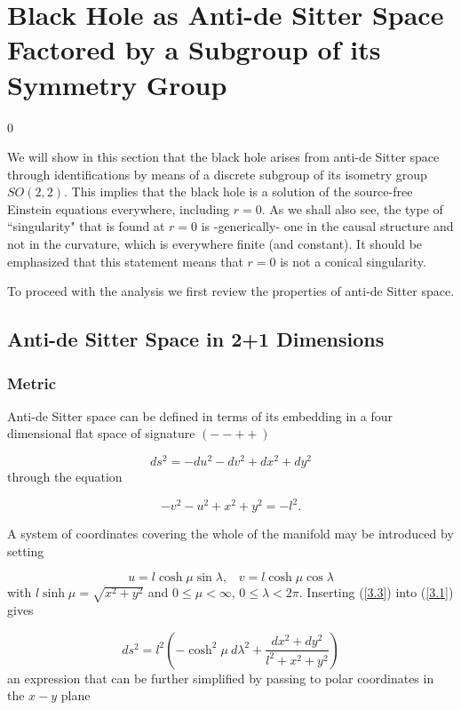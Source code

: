 \documentclass[12pt]{article}
\newcounter{c1} \newcounter{c2}
\newcommand{\bb}{\begin{equation}}
\newcommand{\ee}{\end{equation}}
\begin{document}

\section{Black Hole as Anti-de Sitter Space Factored by a
Subgroup of its Symmetry Group}
\setcounter{equation} 0

We will show in this section that the black hole arises from
anti-de Sitter space through identifications by means of a
discrete subgroup of its isometry group $SO(2,2)$. This implies
that the black hole is a solution of the source-free Einstein
equations everywhere, including $r=0$. As we shall also see, the
type of ``singularity" that is found at $r=0$ is -generically-
one in the causal structure and not in the curvature, which is
everywhere finite (and constant).  It should be emphasized that
this statement means that $r = 0$ is not
a conical singularity.

To proceed with the analysis we first review the properties of
anti-de Sitter space.

\subsection{Anti-de Sitter Space in 2+1 Dimensions}


\subsubsection{Metric}

Anti-de Sitter space can be defined in terms of its embedding in a
four dimensional flat space of signature $(- -++)$

\bb
ds^2=-du^2-dv^2+dx^2+dy^2
\label{3.1}
\ee
%
through the equation

\bb
-v^2-u^2+x^2+y^2=-l^2.
\label{3.2}
\ee

A system of coordinates covering the whole of the manifold may be
introduced by setting

\bb
u=l\cosh\mu \sin\lambda, \;\;\; v=l\cosh\mu \cos\lambda
\label{3.3}
\ee
%
with $l\sinh\mu=\sqrt{x^2+y^2}$ and $0\leq \mu <\infty$,
$0\leq\lambda <2\pi$.  Inserting (\ref{3.3}) into (\ref{3.1})
gives

\bb
ds^2= l^2\left(- \cosh^2\mu \ d\lambda^2 + \frac{dx^2+dy^2 }{l^2 +x^2
+y^2}\right)
\label{3.4}
\ee
%
an expression that can be further simplified by passing to polar
coordinates in the $x-y$ plane
\end{document}
